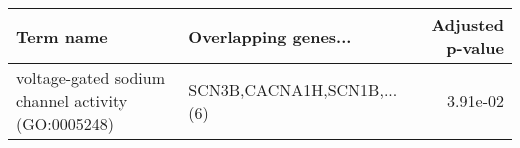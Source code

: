 \begin{tabular}{llr}
\toprule
                                         Term name &       Overlapping genes... &  Adjusted p-value \\
\midrule
voltage-gated sodium channel activity (GO:0005248) & SCN3B,CACNA1H,SCN1B,...(6) &          3.91e-02 \\
\bottomrule
\end{tabular}
